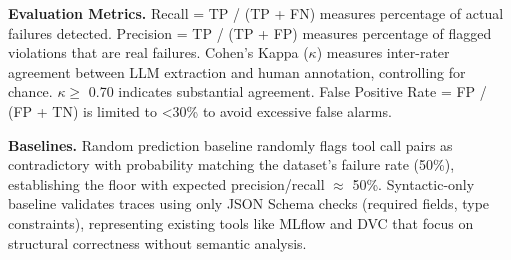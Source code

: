 \textbf{Evaluation Metrics.} Recall = TP / (TP + FN) measures percentage of actual failures detected. Precision = TP / (TP + FP) measures percentage of flagged violations that are real failures. Cohen's Kappa ($\kappa$) measures inter-rater agreement between LLM extraction and human annotation, controlling for chance. $\kappa \geq$ 0.70 indicates substantial agreement. False Positive Rate = FP / (FP + TN) is limited to <30\% to avoid excessive false alarms.

\textbf{Baselines.} Random prediction baseline randomly flags tool call pairs as contradictory with probability matching the dataset's failure rate (50\%), establishing the floor with expected precision/recall $\approx$ 50\%. Syntactic-only baseline validates traces using only JSON Schema checks (required fields, type constraints), representing existing tools like MLflow and DVC that focus on structural correctness without semantic analysis.
